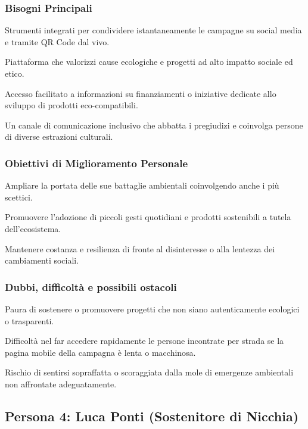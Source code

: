 \documentclass[11pt,a4paper]{article}
\begin{document}
\subsubsection{Bisogni Principali}

Strumenti integrati per condividere istantaneamente le campagne su social media e tramite QR Code dal vivo.

Piattaforma che valorizzi cause ecologiche e progetti ad alto impatto sociale ed etico.

Accesso facilitato a informazioni su finanziamenti o iniziative dedicate allo sviluppo di prodotti eco-compatibili.

Un canale di comunicazione inclusivo che abbatta i pregiudizi e coinvolga persone di diverse estrazioni culturali.

\subsubsection{Obiettivi di Miglioramento Personale}

Ampliare la portata delle sue battaglie ambientali coinvolgendo anche i più scettici.

Promuovere l'adozione di piccoli gesti quotidiani e prodotti sostenibili a tutela dell'ecosistema.

Mantenere costanza e resilienza di fronte al disinteresse o alla lentezza dei cambiamenti sociali.

\subsubsection{Dubbi, difficoltà e possibili ostacoli}

Paura di sostenere o promuovere progetti che non siano autenticamente ecologici o trasparenti.

Difficoltà nel far accedere rapidamente le persone incontrate per strada se la pagina mobile della campagna è lenta o macchinosa.

Rischio di sentirsi sopraffatta o scoraggiata dalla mole di emergenze ambientali non affrontate adeguatamente.


\subsection{Persona 4: Luca Ponti (Sostenitore di Nicchia)}
\label{subsec:persona4}
\end{document}
